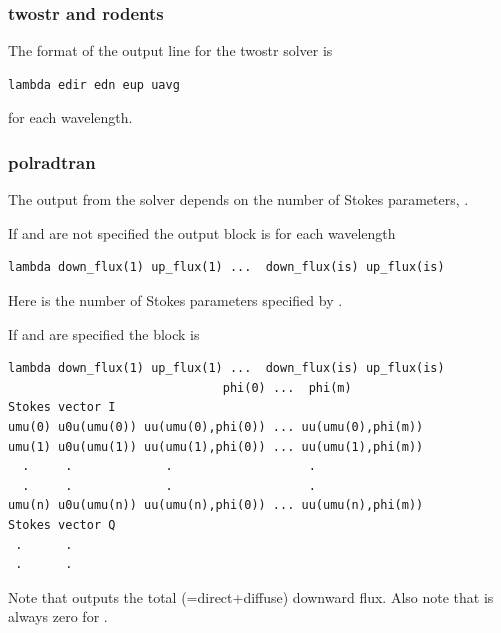 \subsubsection{twostr and rodents}
The format of the output line for the twostr
solver is
\begin{Verbatim}[fontsize=\footnotesize, frame=single]  
lambda edir edn eup uavg
\end{Verbatim}
for each wavelength.


\subsubsection{polradtran}
The output from the  solver
depends on the number of Stokes parameters,
. 

If  and  are not specified the output block is
for each wavelength
\begin{Verbatim}[fontsize=\footnotesize, frame=single, samepage=true]  
lambda down_flux(1) up_flux(1) ...  down_flux(is) up_flux(is)
\end{Verbatim}
Here  is the number of Stokes parameters specified by
. 

If  and  are specified the block is
\begin{Verbatim}[fontsize=\footnotesize, frame=single, samepage=true]  
lambda down_flux(1) up_flux(1) ...  down_flux(is) up_flux(is) 
                              phi(0) ...  phi(m) 
Stokes vector I 
umu(0) u0u(umu(0)) uu(umu(0),phi(0)) ... uu(umu(0),phi(m)) 
umu(1) u0u(umu(1)) uu(umu(1),phi(0)) ... uu(umu(1),phi(m)) 
  .     .             .                   .  
  .     .             .                   . 
umu(n) u0u(umu(n)) uu(umu(n),phi(0)) ... uu(umu(n),phi(m))
Stokes vector Q 
 .      .  
 .      . 
\end{Verbatim}
Note that  outputs the total
(=direct+diffuse) downward flux. Also note that  is always zero for
.


